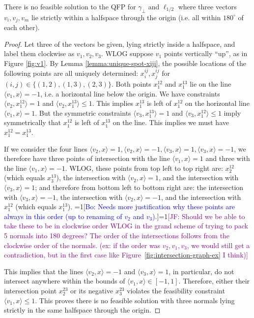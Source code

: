 \documentclass[anon]{colt2020} %
\newcommand{\Comments}{1}
\newcommand{\mynote}[2]{\ifnum\Comments=1\textcolor{#1}{#2}\fi}
\newcommand{\jessie}[1]{\mynote{purple}{[JF: #1]}}
\newcommand{\bo}[1]{\mynote{blue}{[Bo: #1]}}
\newcommand{\inprod}[2]{\langle #1, #2 \rangle}%
\begin{document}
\begin{lemma} \label{lemma:180-degree-no-three}
	There is no feasible solution to the QFP for $\gamma_{\bot}$ and $\ell_{1/2}$ where three vectors $v_i,v_j,v_m$ lie strictly within a halfspace through the origin (i.e. all within $180^{\circ}$ of each other).
\end{lemma}
\begin{proof}
	Let three of the vectors be given, lying strictly inside a halfspace, and label them clockwise as $v_1,v_2,v_3$.
	WLOG suppose $v_1$ points vertically ``up'', as in Figure \ref{fig:v1}.
	By Lemma \ref{lemma:unique-spot-xiji}, the possible locations of the following points are all uniquely determined: $x^{ij}_i, x^{ij}_j$ for $(i,j) \in \{(1,2),(1,3),(2,3)\}$.
	Both points $x^{12}_1$ and $x^{13}_1$ lie on the line $\inprod{v_1}{x} = -1$, i.e. a horizontal line below the origin.
	We have constraints $\inprod{v_2}{x^{12}_1} = 1$ and $\inprod{v_2}{x^{13}_1} \leq 1$.
	This implies $x^{13}_1$ is left of $x^{12}_1$ on the horizontal line $\inprod{v_1}{x} = 1$. 
	But the symmetric constraints $\inprod{v_3}{x^{13}_1} = 1$ and $\inprod{v_3}{x^{12}_1} \leq 1$ imply symmetrically that $x^{12}_1$ is left of $x^{13}_1$ on the line.
	This implies we must have $x^{12}_1 = x^{13}_1$.
	
	If we consider the four lines $\inprod{v_2}{x}=1, \inprod{v_2}{x}=-1, \inprod{v_3}{x}=1, \inprod{v_3}{x}=-1$, we therefore have three points of intersection with the line $\inprod{v_1}{x}=1$ and three with the line $\inprod{v_1}{x}=-1$. 
	WLOG, these points from top left to top right are: $x^{12}_2$ (which equals $x^{13}_3$), the intersection with $\inprod{v_2}{x}=1$, and the intersection with $\inprod{v_3}{x}=1$; and therefore from bottom left to bottom right are: the intersection with $\inprod{v_3}{x}=-1$, the intersection with $\inprod{v_2}{x}=-1$, and the intersection with $x^{12}_1$ (which equals $x^{13}_1$).
	\bo{Needs more justification why these points are always in this order (up to renaming of $v_2$ and $v_3$).}\jessie{Should we be able to take these to be in clockwise order WLOG in the grand scheme of trying to pack 5 normals into 180 degrees?  The order of the intersections follows from the clockwise order of the normals.  (ex: if the order was $v_2, v_1, v_3$, we would still get a contradiction, but in the first case like Figure~\ref{fig:intersection-graph-ex} I think)}
	
	This implies that the lines $\inprod{v_2}{x}=-1$ and $\inprod{v_3}{x}=1$, in particular, do not intersect anywhere within the bounds of $\inprod{v_1}{x} \in [-1,1]$.
	Therefore, either their intersection point $x^{23}_2$ or its negative $x^{23}_3$ violates the feasibility constraint $\inprod{v_1}{x} \leq 1$.
	This proves there is no feasible solution with three normals lying strictly in the same halfspace through the origin.
\end{proof}
\end{document}

